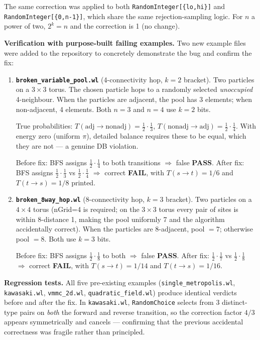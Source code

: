\documentclass[12pt,a4paper]{article}
\theoremstyle{critical}
\theoremstyle{remark}
\begin{document}
The same correction was applied to both \texttt{RandomInteger[\{lo,hi\}]} and
\texttt{RandomInteger[\{0,n-1\}]}, which share the same rejection-sampling logic.
For $n$ a power of two, $2^k = n$ and the correction is 1 (no change).

\textbf{Verification with purpose-built failing examples.}
Two new example files were added to the repository to concretely demonstrate the bug
and confirm the fix:

\begin{enumerate}
\item \textbf{\texttt{broken\_variable\_pool.wl}} (4-connectivity hop, $k=2$ bracket).
  Two particles on a $3\times 3$ torus. The chosen particle hops to a randomly selected
  \emph{unoccupied} 4-neighbour. When the particles are adjacent, the pool has 3
  elements; when non-adjacent, 4 elements. Both $n=3$ and $n=4$ use $k=2$ bits.

  True probabilities: $T(\text{adj}\to\text{nonadj}) = \tfrac{1}{2}\cdot\tfrac{1}{3}$,
  $T(\text{nonadj}\to\text{adj}) = \tfrac{1}{2}\cdot\tfrac{1}{4}$.
  With energy zero (uniform $\pi$), detailed balance requires these to be equal, which
  they are not --- a genuine DB violation.

  Before fix: BFS assigns $\tfrac{1}{2}\cdot\tfrac{1}{4}$ to both transitions
  $\Rightarrow$ false \textbf{PASS}.
  After fix: BFS assigns $\tfrac{1}{2}\cdot\tfrac{1}{3}$ vs $\tfrac{1}{2}\cdot\tfrac{1}{4}$
  $\Rightarrow$ correct \textbf{FAIL}, with $T(s\to t)=1/6$ and $T(t\to s)=1/8$ printed.

\item \textbf{\texttt{broken\_8way\_hop.wl}} (8-connectivity hop, $k=3$ bracket).
  Two particles on a $4\times 4$ torus (nGrid=4 is required; on the $3\times 3$ torus
  every pair of sites is within 8-distance 1, making the pool uniformly 7 and the
  algorithm accidentally correct). When the particles are 8-adjacent, pool $=7$; otherwise
  pool $=8$. Both use $k=3$ bits.

  Before fix: BFS assigns $\tfrac{1}{2}\cdot\tfrac{1}{8}$ to both
  $\Rightarrow$ false \textbf{PASS}.
  After fix: $\tfrac{1}{2}\cdot\tfrac{1}{7}$ vs $\tfrac{1}{2}\cdot\tfrac{1}{8}$
  $\Rightarrow$ correct \textbf{FAIL}, with $T(s\to t)=1/14$ and $T(t\to s)=1/16$.
\end{enumerate}

\textbf{Regression tests.}
All five pre-existing examples (\texttt{single\_metropolis.wl}, \texttt{kawasaki.wl},
\texttt{vmmc\_2d.wl}, \texttt{quadratic\_field.wl}) produce identical verdicts
before and after the fix.  In \texttt{kawasaki.wl}, \texttt{RandomChoice} selects
from 3 distinct-type pairs on \emph{both} the forward and reverse transition, so the
correction factor $4/3$ appears symmetrically and cancels --- confirming that the previous
accidental correctness was fragile rather than principled.
\end{document}
